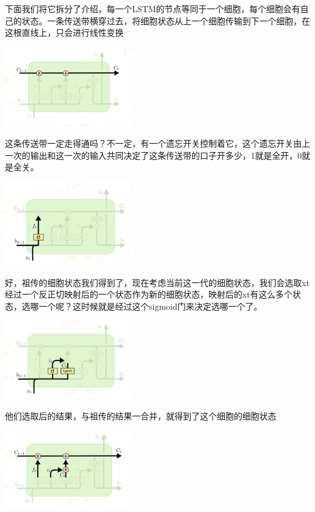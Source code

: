 \documentclass{article}
\begin{document}
下面我们将它拆分了介绍，每一个LSTM的节点等同于一个细胞，每个细胞会有自己的状态。一条传送带横穿过去，将细胞状态从上一个细胞传输到下一个细胞，在这根直线上，只会进行线性变换
\begin{center}
\includegraphics[width=2.2in]{image/image030.jpg}
\end{center}

这条传送带一定走得通吗？不一定，有一个遗忘开关控制着它，这个遗忘开关由上一次的输出和这一次的输入共同决定了这条传送带的口子开多少，1就是全开，0就是全关。
\begin{center}
\includegraphics[width=2.2in]{image/image031.jpg}
\end{center}


好，祖传的细胞状态我们得到了，现在考虑当前这一代的细胞状态，我们会选取xt经过一个反正切映射后的一个状态作为新的细胞状态，映射后的xt有这么多个状态，选哪一个呢？这时候就是经过这个sigmoid门来决定选哪一个了。
\begin{center}
\includegraphics[width=2.2in]{image/image032.jpg}
\end{center}


他们选取后的结果，与祖传的结果一合并，就得到了这个细胞的细胞状态
\begin{center}
\includegraphics[width=2.2in]{image/image033.jpg}
\end{center}
\end{document}
